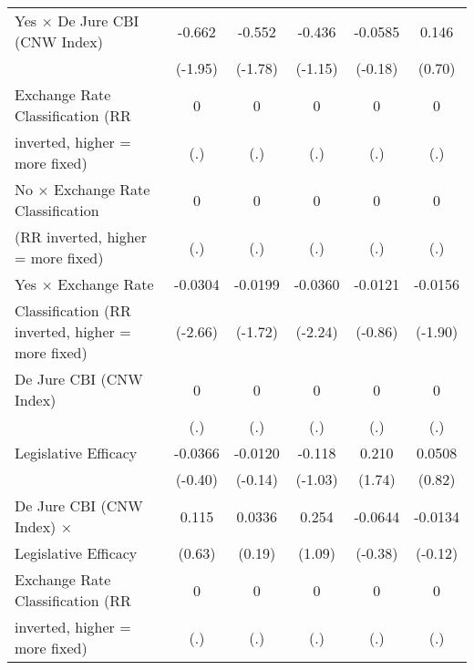 {\begin{tabular}{l*{5}{c}}
\addlinespace
Yes $\times$ De Jure CBI (CNW Index)    &-0.662         &-0.552         &-0.436         &-0.0585         &0.146         \\
                                        &(-1.95)         &(-1.78)         &(-1.15)         &(-0.18)         &(0.70)         \\
\addlinespace
Exchange Rate Classification (RR        &    0         &    0         &    0         &    0         &    0         \\
inverted, higher = more fixed)          &  (.)         &  (.)         &  (.)         &  (.)         &  (.)         \\
\addlinespace
No $\times$ Exchange Rate Classification&    0         &    0         &    0         &    0         &    0         \\
(RR inverted, higher = more fixed)      &  (.)         &  (.)         &  (.)         &  (.)         &  (.)         \\
\addlinespace
Yes $\times$ Exchange Rate              &-0.0304\sym{**} &-0.0199         &-0.0360\sym{*}  &-0.0121         &-0.0156         \\
Classification (RR inverted, higher = more fixed)&(-2.66)         &(-1.72)         &(-2.24)         &(-0.86)         &(-1.90)         \\
\addlinespace
De Jure CBI (CNW Index)                 &    0         &    0         &    0         &    0         &    0         \\
                                        &  (.)         &  (.)         &  (.)         &  (.)         &  (.)         \\
\addlinespace
Legislative Efficacy                    &-0.0366         &-0.0120         &-0.118         &0.210         &0.0508         \\
                                        &(-0.40)         &(-0.14)         &(-1.03)         &(1.74)         &(0.82)         \\
\addlinespace
De Jure CBI (CNW Index) $\times$        &0.115         &0.0336         &0.254         &-0.0644         &-0.0134         \\
Legislative Efficacy                    &(0.63)         &(0.19)         &(1.09)         &(-0.38)         &(-0.12)         \\
\addlinespace
Exchange Rate Classification (RR        &    0         &    0         &    0         &    0         &    0         \\
inverted, higher = more fixed)          &  (.)         &  (.)         &  (.)         &  (.)         &  (.)         \\

\end{tabular}}
